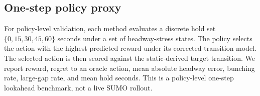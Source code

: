 \subsection{One-step policy proxy}

For policy-level validation, each method evaluates a discrete hold set
$\{0,15,30,45,60\}$ seconds under a set of headway-stress states.
The policy selects the action with the highest predicted reward under its corrected transition model.
The selected action is then scored against the static-derived target transition.
We report reward, regret to an oracle action, mean absolute headway error, bunching rate, large-gap rate, and mean hold seconds.
This is a policy-level one-step lookahead benchmark, not a live SUMO rollout.
